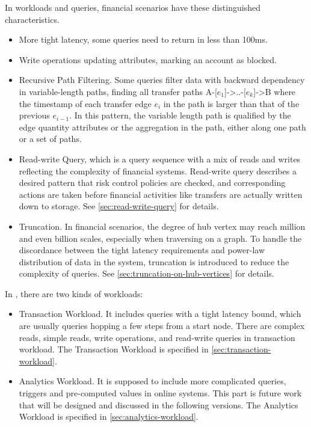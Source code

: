 In workloads and queries, financial scenarios have these distinguished characteristics.
\begin{itemize}
      \item More tight latency, \eg some queries need to return in less than 100ms.
      \item Write operations updating attributes, \eg marking an account as blocked.
      \item Recursive Path Filtering. Some queries filter data with backward dependency
            in variable-length paths, \eg finding all transfer paths A-[${e_1}$]->..-[${e_k}$]->B
            where the timestamp of each transfer edge ${e_i}$ in the path is larger than that of
            the previous ${e_{i-1}}$. In this pattern, the variable length path is qualified by
            the edge quantity attributes or the aggregation in the path, either along one path
            or a set of paths.
      \item Read-write Query, which is a query sequence with a mix of reads and writes reflecting the
            complexity of financial systems. Read-write query describes a desired pattern that risk control
            policies are checked, and corresponding actions are taken before financial activities like
            transfers are actually written down to storage. See \autoref{sec:read-write-query} for details.
      \item Truncation. In financial scenarios, the degree of hub vertex may reach million and even
            billion scales, especially when traversing on a graph. To handle the discordance between the tight
            latency requirements and power-law distribution of data in the system, truncation is introduced
            to reduce the complexity of queries. See \autoref{sec:truncation-on-hub-vertices} for details.
\end{itemize}

In \ldbcfinbench, there are two kinds of workloads:
\begin{itemize}
      \item Transaction Workload. It includes queries with a tight latency bound, which are usually
            queries hopping a few steps from a start node. There are complex reads, simple reads, write
            operations, and read-write queries in transaction workload. The Transaction Workload is specified
            in \autoref{sec:transaction-workload}.
      \item Analytics Workload. It is supposed to include more complicated queries, \eg triggers and pre-computed
            values in online systems. This part is future work that will be designed and discussed in the
            following versions. The Analytics Workload is specified in \autoref{sec:analytics-workload}.
\end{itemize}


